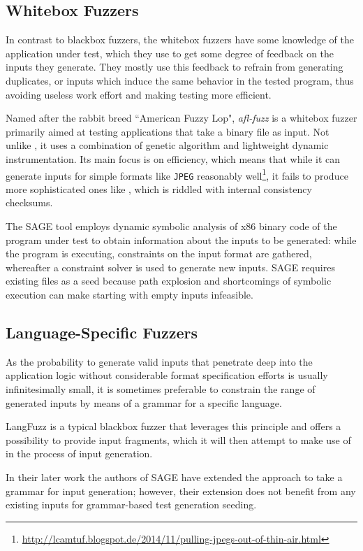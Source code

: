 \subsection{Whitebox Fuzzers}
In contrast to blackbox fuzzers, the whitebox fuzzers have some knowledge of the application under
test, which they use to get some degree of feedback on the inputs they generate. They mostly use this feedback
to refrain from generating duplicates, or inputs which induce the same behavior in the tested program, thus
avoiding useless work effort and making testing more efficient.

Named after the rabbit breed ``American Fuzzy Lop", \emph{afl-fuzz}\cite{afl} is a whitebox fuzzer
primarily aimed at testing applications that take a binary file as input. Not unlike \xmlmate, it uses a
combination of genetic algorithm and lightweight dynamic instrumentation. Its main focus is on
efficiency, which means that while it can generate inputs for simple formats like \texttt{JPEG} reasonably
well\footnote{\url{http://lcamtuf.blogspot.de/2014/11/pulling-jpegs-out-of-thin-air.html}}, it fails
to produce more sophisticated ones like \png, which is riddled with internal consistency checksums.

The SAGE\cite{godefroid-sage} tool employs dynamic symbolic analysis of x86 binary code of the program under
test to obtain information about the inputs to be generated: while the program is executing, constraints on
the input format are gathered, whereafter a constraint solver is used to generate new inputs. SAGE requires
existing files as a seed because path explosion and shortcomings of symbolic execution can make starting with
empty inputs infeasible.

\subsection{Language-Specific Fuzzers}
As the probability to generate valid inputs that penetrate deep into the application logic without considerable
format specification efforts is usually infinitesimally small, it is sometimes preferable to constrain the
range of generated inputs by means of a grammar for a specific language.

LangFuzz\cite{holler2012} is a typical blackbox fuzzer that leverages this principle and offers a possibility
to provide input fragments, which it will then attempt to make use of in the process of input generation.

In their later work \cite{Godefroid:2008:GWF:1375581.1375607} the authors of SAGE have extended the approach to
take a grammar for input generation; however, their extension does not benefit from any existing inputs for
grammar-based test generation seeding.

